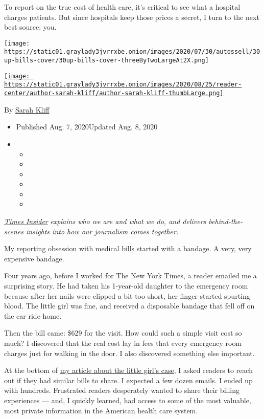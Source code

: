 To report on the true cost of health care, it's critical to see what a
hospital charges patients. But since hospitals keep those prices a
secret, I turn to the next best source: you.

\texttt{[image: https://static01.graylady3jvrrxbe.onion/images/2020/07/30/autossell/30up-bills-cover/30up-bills-cover-threeByTwoLargeAt2X.png]}

\href{https://www.nytimes3xbfgragh.onion/by/sarah-kliff}{\texttt{[image: https://static01.graylady3jvrrxbe.onion/images/2020/08/25/reader-center/author-sarah-kliff/author-sarah-kliff-thumbLarge.png]}}

By \href{https://www.nytimes3xbfgragh.onion/by/sarah-kliff}{Sarah Kliff}

\begin{itemize}
\item
  Published Aug. 7, 2020Updated Aug. 8, 2020
\item
  \begin{itemize}
  \item
  \item
  \item
  \item
  \item
  \item
  \end{itemize}
\end{itemize}

\href{https://www.nytimes3xbfgragh.onion/series/times-insider}{\emph{Times
Insider}} \emph{explains who we are and what we do, and delivers
behind-the-scenes insights into how our journalism comes together.}

My reporting obsession with medical bills started with a bandage. A
very, very expensive bandage.

Four years ago, before I worked for The New York Times, a reader emailed
me a surprising story. He had taken his 1-year-old daughter to the
emergency room because after her nails were clipped a bit too short, her
finger started spurting blood. The little girl was fine, and received a
disposable bandage that fell off on the car ride home.

Then the bill came: \$629 for the visit. How could such a simple visit
cost so much? I discovered that the real cost lay in fees that every
emergency room charges just for walking in the door. I also discovered
something else important.

At the bottom of
\href{https://www.vox.com/2016/5/13/11606760/emergency-facility-fees-american-health-care}{my
article about the little girl's case}, I asked readers to reach out if
they had similar bills to share. I expected a few dozen emails. I ended
up with hundreds. Frustrated readers desperately wanted to share their
billing experiences --- and, I quickly learned, had access to some of
the most valuable, most private information in the American health care
system.

